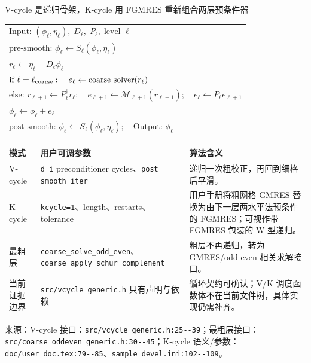 \documentclass[UTF8,aspectratio=169,11pt]{ctexbeamer}
\newcommand{\source}[1]{%
  \vspace{0.06em}\par{\raggedright\scriptsize\color{muted}来源：#1\par}}
\newcommand{\code}[1]{\nolinkurl{#1}}
\newcommand{\denseframe}{%
  \footnotesize
  \setlength{\tabcolsep}{2.5pt}%
  \renewcommand{\arraystretch}{0.76}%
}
\begin{document}
\begin{frame}[t]{V-cycle 是递归骨架，K-cycle 用 FGMRES 重新组合两层预条件器}
  \denseframe
  \scriptsize
  \begin{tabular}{@{}l@{}}
    $\text{Input: }(\phi_\ell,\eta_\ell),\;D_\ell,\;P_\ell,\;\text{level }\ell$ \\
    $\text{pre-smooth: }\phi_\ell\gets S_\ell(\phi_\ell,\eta_\ell)$ \\
    $r_\ell\gets\eta_\ell-D_\ell\phi_\ell$ \\
    $\text{if }\ell=\ell_{\rm coarse}:\quad e_\ell\gets\text{coarse solver}(r_\ell)$ \\
    $\text{else: }r_{\ell+1}\gets P_\ell^\dagger r_\ell;\quad e_{\ell+1}\gets\mathcal{M}_{\ell+1}(r_{\ell+1});\quad e_\ell\gets P_\ell e_{\ell+1}$ \\
    $\phi_\ell\gets\phi_\ell+e_\ell$ \\
    $\text{post-smooth: }\phi_\ell\gets S_\ell(\phi_\ell,\eta_\ell);\quad\text{Output: }\phi_\ell$
  \end{tabular}
  \vspace{0.13cm}
  \begin{tabularx}{0.96\textwidth}{@{}p{}p{}Y@{}}
    \toprule
    模式 & 用户可调参数 & 算法含义 \\
    \midrule
    V-cycle & \texttt{d\_i} preconditioner cycles、\texttt{post smooth iter} & 递归一次粗校正，再回到细格后平滑。 \\
    K-cycle & \code{kcycle=1}、length、restarts、tolerance & 用户手册将粗网格 GMRES 替换为由下一层两水平法预条件的 FGMRES；可视作带 FGMRES 包装的 W 型递归。 \\
    最粗层 & \code{coarse_solve_odd_even}、\code{coarse_apply_schur_complement} & 粗层不再递归，转为 GMRES/odd-even 相关求解接口。 \\
    当前证据边界 & \code{src/vcycle_generic.h} 只有声明与依赖 & 循环契约可确认；V/K 调度函数体不在当前文件树，具体实现仍需补齐。 \\
    \bottomrule
  \end{tabularx}
  \source{V-cycle 接口：\code{src/vcycle_generic.h:25--39}；最粗层接口：\code{src/coarse_oddeven_generic.h:30--45}；K-cycle 语义/参数：\code{doc/user_doc.tex:79--85}、\code{sample_devel.ini:102--109}。}
\end{frame}
\end{document}
